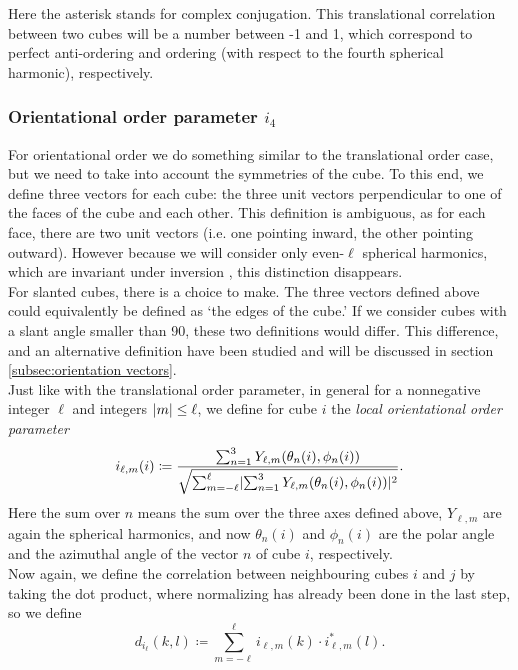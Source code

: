 \documentclass[thesis]{subfiles}
\begin{document}
Here the asterisk stands for complex conjugation. This translational correlation between two cubes will be a number between -1 and 1, which correspond to perfect anti-ordering and ordering (with respect to the fourth spherical harmonic), respectively.%

\subsubsection{Orientational order parameter \texorpdfstring{$i_4$}{i4}} \label{subsubsec:orient order param}

For orientational order we do something similar to the translational order case, but we need to take into account the symmetries of the cube. To this end, we define three vectors for each cube: the three unit vectors perpendicular to one of the faces of the cube and each other. This definition is ambiguous, as for each face, there are two unit vectors (i.e. one pointing inward, the other pointing outward). However because we will consider only even-$\ell$ spherical harmonics, which are invariant under inversion \cite{steinhardt1983bond}, this distinction disappears.\\
For slanted cubes, there is a choice to make. The three vectors defined above could equivalently be defined as `the edges of the cube.' If we consider cubes with a slant angle smaller than 90\degr, these two definitions would differ. This difference, and an alternative definition have been studied and will be discussed in section \ref{subsec:orientation vectors}.%
\\
Just like with the translational order parameter, in general for a nonnegative integer $\ell$ and integers $ \lvert m\rvert \leq \ell$, we define for cube $i$ the \emph{local orientational order parameter}
\begin{equation}
i_{\ell, m}(i) \coloneqq \frac{\sum_{n = 1}^3 Y_{\ell, m}(\theta_n(i), \phi_n(i))}{\sqrt{\sum_{m = -\ell}^\ell \lvert\sum_{n = 1}^3 Y_{\ell, m}(\theta_n(i), \phi_n(i))\rvert^2}}.
\end{equation}
Here the sum over $n$ means the sum over the three axes defined above, $Y_{\ell, m}$ are again the spherical harmonics, and now $\theta_n(i)$ and $\phi_n(i)$ are the polar angle and the azimuthal angle of the vector $n$ of cube $i$, respectively.\\
Now again, we define the correlation between neighbouring cubes $i$ and $j$ by taking the dot product, where normalizing has already been done in the last step, so we define
\begin{equation}
d_{i_\ell}(k,l) \coloneqq \sum_{m = -\ell}^\ell i_{\ell, m}(k) \cdot i^*_{\ell, m}(l).
\end{equation}
\end{document}
